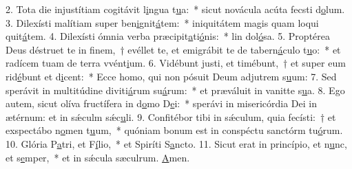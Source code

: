 2. Tota die injustítiam cogitávit l\uline{i}ngua t\uline{u}a:~* sicut novácula acúta fecsti d\uline{o}lum.
3. Dilexísti malítiam super ben\uline{i}gnit\uline{á}tem:~* iniquitátem magis quam loqui quit\uline{á}tem.
4. Dilexísti ómnia verba præcipit\uline{a}ti\uline{ó}nis:~* lin dol\uline{ó}sa.
5. Proptérea Deus déstruet te in finem,~† evéllet te, et emigrábit te de tabern\uline{á}culo t\uline{u}o:~* et radícem tuam de terra vvént\uline{i}um.
6. Vidébunt justi, et timébunt,~† et super eum rid\uline{é}bunt et d\uline{i}cent:~* Ecce homo, qui non pósuit Deum adjutrem s\uline{u}um:
7. Sed sperávit in multitúdine diviti\uline{á}rum su\uline{á}rum:~* et præváluit in vanitte s\uline{u}a.
8. Ego autem, sicut olíva fructífera in d\uline{o}mo D\uline{e}i:~* sperávi in misericórdia Dei in ætérnum: et in sǽculm sǽc\uline{u}li.
9. Confitébor tibi in sǽculum, quia fecísti:~† et exspectábo n\uline{o}men t\uline{u}um,~* quóniam bonum est in conspéctu sanctórm tu\uline{ó}rum.
10. Glória P\uline{a}tri, et F\uline{í}lio,~* et Spiríti S\uline{a}ncto.
11. Sicut erat in princípio, et n\uline{u}nc, et s\uline{e}mper,~* et in sǽcula sæculrum. \uline{A}men.

